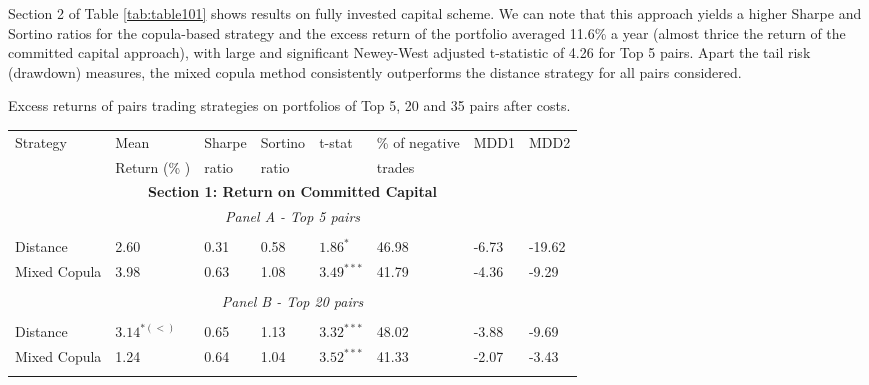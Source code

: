 \documentclass[a4paper,12pt]{report}
\begin{document}
	Section 2 of Table \ref{tab:table101} shows results on fully invested capital scheme. We can note that this approach yields a higher Sharpe and Sortino ratios for the copula-based strategy and the excess return of the portfolio averaged 11.6\% a year (almost thrice the return of the committed capital approach), with large and significant Newey-West adjusted t-statistic of 4.26 for Top 5 pairs. Apart the tail risk (drawdown) measures, the mixed copula method consistently outperforms the distance strategy for all pairs considered.
	
	\begin{threeparttable}[H]
		\centering \tiny
		\caption{Excess returns of pairs trading strategies on portfolios of Top 5, 20 and 35 pairs after costs.}
		\begin{tabularx}{\textwidth}{@{\extracolsep{\fill}}llllllll@{}}
			\toprule
			Strategy & Mean  & Sharpe & Sortino & t-stat & \% of negative   & MDD1 & MDD2 \\
			& Return (\% ) & ratio &  ratio     &  &  trades     &       &  \\
			\midrule
			\multicolumn{8}{c}{\textbf{Section 1: Return on Committed Capital}} \\
			\multicolumn{8}{c}{\textit{Panel A - Top 5 pairs}} \\
			&       &       &       &       &       &       &  \\
			Distance & 2.60  & 0.31  & 0.58  & $1.86^{*}$  & 46.98 & -6.73    & -19.62 \\
			Mixed Copula &  3.98  &  0.63  & 1.08  &  $3.49^{***}$  &  41.79 &  -4.36  &  -9.29 \\
			\multicolumn{1}{r}{} & \multicolumn{1}{r}{} & \multicolumn{1}{r}{} & \multicolumn{1}{r}{} & \multicolumn{1}{r}{} & \multicolumn{1}{r}{} & \multicolumn{1}{r}{} & \multicolumn{1}{r}{} \\
			\multicolumn{8}{c}{\textit{Panel B - Top 20 pairs}} \\
			&       &       &       &       &       &       &  \\
			Distance &  $3.14^{*(<)}$  &  0.65  & 1.13  & $3.32^{***}$  & 48.02 & -3.88  & -9.69 \\
			Mixed Copula  & 1.24  & 0.64  & 1.04  & $3.52^{***}$  & 41.33 &  -2.07  &  -3.43  \\
			\multicolumn{1}{r}{} & \multicolumn{1}{r}{} & \multicolumn{1}{r}{} & \multicolumn{1}{r}{} & \multicolumn{1}{r}{} & \multicolumn{1}{r}{} & \multicolumn{1}{r}{} & \multicolumn{1}{r}{} \\

\end{tabularx}
\end{threeparttable}
\end{document}

